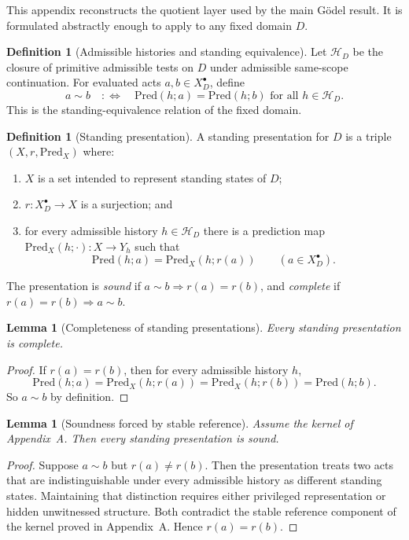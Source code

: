 \documentclass[11pt]{article}
\theoremstyle{plain}
\newtheorem{lemma}[theorem]{Lemma}
\theoremstyle{definition}
\newtheorem{definition}[theorem]{Definition}
\newcommand{\Law}{\sim}
\newcommand{\Eval}{X_D^{\bullet}}
\newcommand{\domain}{D}
\newcommand{\Pred}{\mathrm{Pred}}
\newcommand{\Hist}{\mathcal{H}_D}
\begin{document}
This appendix reconstructs the quotient layer used by the main G\"odel result. It is formulated abstractly enough to apply to any fixed domain $\domain$.

\begin{definition}[Admissible histories and standing equivalence]
Let $\Hist$ be the closure of primitive admissible tests on $\domain$ under admissible same-scope continuation. For evaluated acts $a,b\in\Eval$, define
\[
a\Law b \quad :\Longleftrightarrow \quad \Pred(h;a)=\Pred(h;b) \text{ for all } h\in\Hist.
\]
This is the standing-equivalence relation of the fixed domain.
\end{definition}

\begin{definition}[Standing presentation]
A standing presentation for $\domain$ is a triple $(X,r,\Pred_X)$ where:
\begin{enumerate}[label=(\roman*), leftmargin=2.5em]
    \item $X$ is a set intended to represent standing states of $\domain$;
    \item $r:\Eval\to X$ is a surjection; and
    \item for every admissible history $h\in\Hist$ there is a prediction map $\Pred_X(h;\cdot):X\to Y_h$ such that
    \[
    \Pred(h;a)=\Pred_X(h;r(a))\qquad (a\in\Eval).
    \]
\end{enumerate}
The presentation is \emph{sound} if $a\Law b\Rightarrow r(a)=r(b)$, and \emph{complete} if $r(a)=r(b)\Rightarrow a\Law b$.
\end{definition}

\begin{lemma}[Completeness of standing presentations]
\label{lem:C-complete}
Every standing presentation is complete.
\end{lemma}

\begin{proof}
If $r(a)=r(b)$, then for every admissible history $h$,
\[
\Pred(h;a)=\Pred_X(h;r(a))=\Pred_X(h;r(b))=\Pred(h;b).
\]
So $a\Law b$ by definition.
\end{proof}

\begin{lemma}[Soundness forced by stable reference]
\label{lem:C-sound}
Assume the kernel of Appendix~A. Then every standing presentation is sound.
\end{lemma}

\begin{proof}
Suppose $a\Law b$ but $r(a)\neq r(b)$. Then the presentation treats two acts that are indistinguishable under every admissible history as different standing states. Maintaining that distinction requires either privileged representation or hidden unwitnessed structure. Both contradict the stable reference component of the kernel proved in Appendix~A. Hence $r(a)=r(b)$.
\end{proof}
\end{document}
